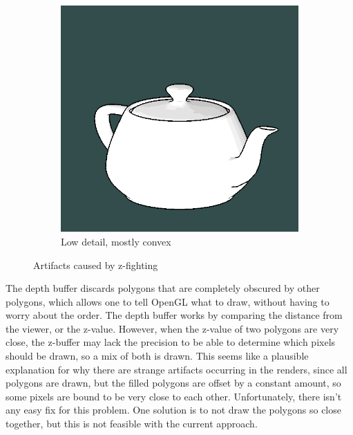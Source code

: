 \begin{figure}[h]
\begin{subfigure}[b]{0.35\textwidth}
        \includegraphics[width=\textwidth]{img/z-fighting-teapot}
        \caption{Low detail, mostly convex}
        \label{fig:z-fighting-low}
    \end{subfigure}
    \caption{Artifacts caused by z-fighting}
    \label{fig:z-fighting}
\end{figure}

The depth buffer discards polygons that are completely obscured by other polygons, which allows one to tell OpenGL 
what to draw, without having to worry about the order. The depth buffer works by comparing the distance from the viewer, or 
the z-value. However, when the z-value of two polygons are very close, the z-buffer may lack the precision to be able to 
determine which pixels should be drawn, so a mix of both is drawn. This seems like a plausible explanation for why there are 
strange artifacts occurring in the renders, since all polygons are drawn, but the filled polygons are offset by a constant 
amount, so some pixels are bound to be very close to each other. Unfortunately, there isn't any easy fix for this problem. 
One solution is to not draw the polygons so close together, but this is not feasible with the current approach.
